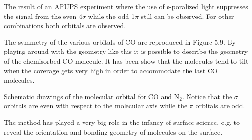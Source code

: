 \vspace*{11cm}

            The result of an ARUPS experiment where the use of s-poralized light suppresses the signal from the even 4$\sigma$ while the odd 1$\pi$ still can be observed. For other combinations both orbitals are observed.

\vspace{1cm}

The symmetry of the various orbitals of CO are reproduced in Figure 5.9. By playing around with the geometry like this it is possible to describe the geometry of the chemisorbed CO molecule. It has been show that the molecules tend to tilt when the coverage gets very high in order to accommodate the last CO molecules.

\vspace*{11cm}

            Schematic drawings of the molecular orbital for CO and N$_{2}$. Notice that the $\sigma$ orbitals are even with respect to the molecular axis while the $\pi$ orbitals are odd.

\vspace{1cm}

The method has played a very big role in the infancy of surface science, e.g. to reveal the orientation and bonding geometry of molecules on the surface.